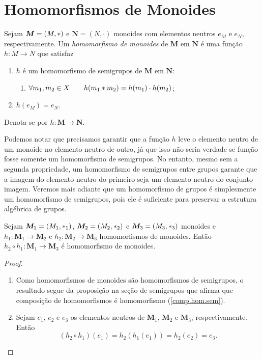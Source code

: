 \section{Homomorfismos de Monoides}

\begin{defi}
	Sejam $\bm M=(M, \ast )$ e $\bm N=(N,\cdot)$ monoides com elementos neutros $e_M$ e $e_N$, respectivamente. Um \emph{homomorfismo de monoides} de $\bm M$ em $\bm N$ é uma função $h: M \to N$ que satisfaz
	\begin{enumerate}
	\item $h$ é um homomorfismo de semigrupos de $\bm M$ em $\bm N$:
		\begin{enumerate}
		\item $\forall m_1,m_2 \in X \qquad h(m_1  \ast  m_2)=h(m_1) \cdot h(m_2)$;
		\end{enumerate}
	\item $h(e_M)=e_N$.
	\end{enumerate}
\noindent Denota-se por $h: \bm M \to \bm N$. %
\end{defi}

	Podemos notar que precisamos garantir que a função $h$ leve o elemento neutro de um monoide no elemento neutro de outro, já que isso não seria verdade se função fosse somente um homomorfismo de semigrupos. No entanto, mesmo sem a segunda propriedade, um homomorfismo de semigrupos entre grupos garante que a imagem do elemento neutro do primeiro seja um elemento neutro do conjunto imagem. Veremos mais adiante que um homomorfismo de grupos é simplesmente um homomorfismo de semigrupos, pois ele é suficiente para preservar a estrutura algébrica de grupos.

\begin{prop}
\label{comp.hom.mon}
	Sejam $\bm M_1=(M_1, \ast _1)$, $\bm M_2=(M_2, \ast _2)$ e $\bm M_3=(M_3, \ast _3)$ monoides e $h_1: \bm M_1 \to \bm M_2$ e $h_2: \bm M_2 \to \bm M_3$ homomorfismos de monoides. Então $h_2 \circ h_1: \bm M_1 \to \bm M_3$ é homomorfismo de monoides.
\end{prop}
\begin{proof}
	\begin{enumerate}
	\item Como homomorfismos de monoides são homomorfismos de semigrupos, o resultado segue da proposição na seção de semigrupos que afirma que composição de homomorfismos é homomorfismo (\ref{comp.hom.sem}).
	\item Sejam $e_1$, $e_2$ e $e_3$ os elementos neutros de $\bm M_1$, $\bm M_2$ e $\bm M_3$, respectivamente. Então
	\begin{equation*}
	(h_2 \circ h_1)(e_1) = h_2(h_1(e_1)) = h_2(e_2) = e_3.
	\end{equation*}
	\end{enumerate}
\end{proof}




